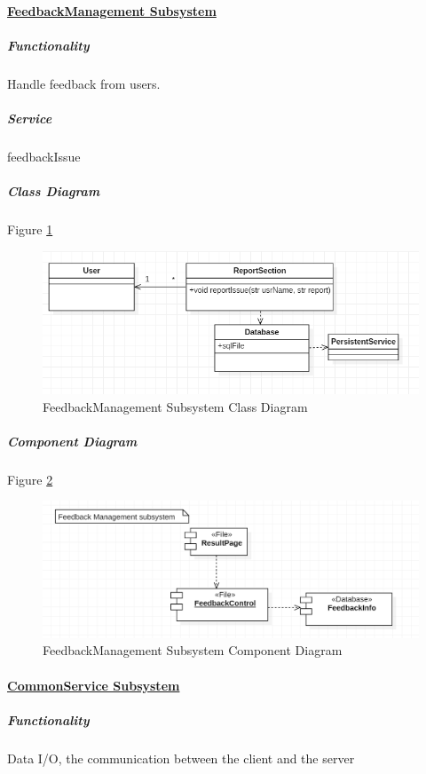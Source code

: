 \documentclass[10pt]{article}
\begin{document}
\paragraph{\underline{FeedbackManagement Subsystem}}
\subparagraph{Functionality} Handle feedback from users.

\subparagraph{Service}  feedbackIssue

\subparagraph{Class Diagram} Figure \ref{FeedbackManagement Subsystem Class Diagram}

\begin{figure}[H]
	\centering
	
	\includegraphics[width=14cm]{reportclass.png}
	\caption{FeedbackManagement Subsystem Class Diagram}
	\label{FeedbackManagement Subsystem Class Diagram}
\end{figure}

\subparagraph{Component Diagram} Figure \ref{FeedbackManagement Subsystem Component Diagram}

\begin{figure}[H]
	\centering
	
	\includegraphics[width=14cm]{reportcom.png}
	\caption{FeedbackManagement Subsystem Component Diagram}
	\label{FeedbackManagement Subsystem Component Diagram}
\end{figure}

\paragraph{\underline{CommonService  Subsystem}}
\subparagraph{Functionality} Data I/O, the communication between the client and the server
\end{document}
